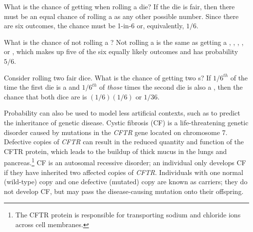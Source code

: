 \begin{examplewrap}
\begin{nexample}{What is the chance of getting  when rolling a die?}\label{probOf1}
If the die is fair, then there must be an equal chance of rolling a  as any other possible number. Since there are six outcomes, the chance must be 1-in-6 or, equivalently, $1/6$.
\end{nexample}
\end{examplewrap}

\begin{examplewrap}
\begin{nexample}{What is the chance of not rolling a ?}\label{probNot2}
Not rolling a  is the same as getting a , , , , or , which makes up five of the six equally likely outcomes and has probability $5/6$.
\end{nexample}
\end{examplewrap}

\begin{examplewrap}
\begin{nexample}{Consider rolling two fair dice. What is the chance of getting two s?}\label{probOf2Ones}
If $1/6^{th}$ of the time the first die is a  and $1/6^{th}$ of \emph{those} times the second die is also a , then the chance that both dice are  is $(1/6) (1/6)$ or $1/36$.
\end{nexample}
\end{examplewrap}

Probability can also be used to model less artificial contexts, such as to predict the inheritance of genetic disease. Cystic fibrosis (CF) is a life-threatening genetic disorder caused by mutations in the \textit{CFTR} gene located on chromosome 7. Defective copies of \textit{CFTR} can result in the reduced quantity and function of the CFTR protein, which leads to the buildup of thick mucus in the lungs and pancreas.\footnote{The CFTR protein is responsible for transporting sodium and chloride ions across cell membranes.} CF is an autosomal recessive disorder; an individual only develops CF if they have inherited two affected copies of \textit{CFTR}. Individuals with one normal (wild-type) copy and one defective (mutated) copy are known as carriers; they do not develop CF, but may pass the disease-causing mutation onto their offspring.

\textD{\newpage}

